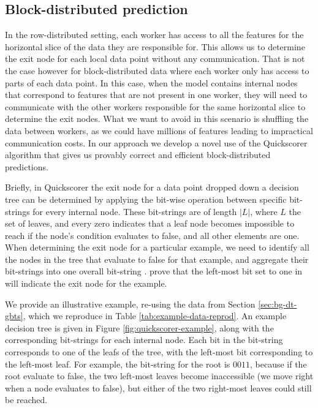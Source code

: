 \subsection{Block-distributed prediction}
\label{subsec:block-gbt-prediction}

In the row-distributed setting, each worker has access to all the features for the
horizontal slice of the data they are responsible for. This allows us to determine
the exit node for each local data point without any communication.
That is not the case however
for block-distributed data where each worker only has access to parts of each data
point. In this case, when the model contains internal nodes that correspond to features
that are not present in one worker, they will need to communicate with the other
workers responsible for the same horizontal slice to determine the exit nodes.
What we want to avoid in this scenario is shuffling the data between workers,
as we could have millions of features leading to impractical communication
costs. In our approach we develop a novel use of the Quickscorer \cite{quickscorer} algorithm
that gives us provably correct and efficient block-distributed predictions.

Briefly, in Quickscorer the exit node for a data point dropped down a decision tree can be determined by applying the bit-wise
\AND operation between specific bit-strings for every internal node.
These bit-strings are of length $|L|$, where $L$ the set of leaves, and
every zero indicates that a leaf node becomes impossible to reach if the node's
condition evaluates to false, and all other elements are one. When determining
the exit node for a particular example, we need to identify all the nodes in
the tree that evaluate to false for that example, and aggregate their bit-strings into one overall
bit-string \bitstring.
\citet{quickscorer}
prove that the left-most bit set to one in \bitstring will indicate the exit node for the example.

We provide an illustrative example, re-using the data from Section \ref{sec:bg-dt-gbts},
which we reproduce in Table \ref{tab:example-data-reprod}. An example decision tree
is given in Figure \ref{fig:quickscorer-example}, along with the corresponding
bit-strings for each internal node. Each bit in the bit-string
corresponds to one of the leafs of the tree, with the left-most bit corresponding
to the left-most leaf. For example, the bit-string for the root is $0011$, because
if the root evaluate to false, the two left-most leaves become inaccessible
(we move right when a node evaluates to false), but either of the
two right-most leaves could still be reached.

